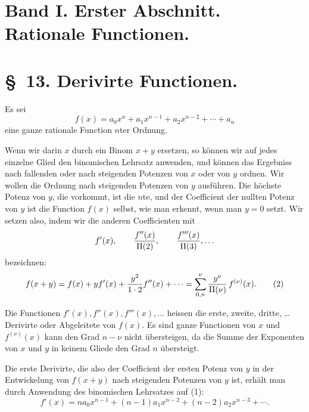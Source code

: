 \documentclass[11pt]{article}
\begin{document}
\clearpage

\clearpage
\section*{Band I. Erster Abschnitt. Rationale Functionen.}

\section*{\S~13. Derivirte Functionen.}

Es sei
\begin{equation}
 f(x)=a_0x^n+a_1x^{n-1}+a_2x^{n-2}+\cdots+a_n
\tag{1}
\end{equation}
eine ganze rationale Function $n$ter Ordnung.

Wenn wir darin $x$ durch ein Binom $x+y$ ersetzen, so können wir auf jedes einzelne Glied den binomischen Lehrsatz anwenden, und können das Ergebniss nach fallenden oder nach steigenden Potenzen von $x$ oder von $y$ ordnen. Wir wollen die Ordnung nach steigenden Potenzen von $y$ ausführen. Die höchste Potenz von $y$, die vorkommt, ist die $n$te, und der Coefficient der nullten Potenz von $y$ ist die Function $f(x)$ selbst, wie man erkennt, wenn man $y=0$ setzt. Wir setzen also, indem wir die anderen Coefficienten mit
\[
 f'(x),\qquad {f''(x)\over \Pi(2)},\qquad {f'''(x)\over \Pi(3)},\ldots
\]
bezeichnen:
\begin{equation}
 f(x+y)=f(x)+yf'(x)+{y^2\over1\cdot2}f''(x)+\cdots
       =\sum_{0,n}^{\nu}{y^\nu\over\Pi(\nu)}\,f^{(\nu)}(x).
\tag{2}
\end{equation}

Die Functionen $f'(x),f''(x),f'''(x),\ldots$ heissen die erste, zweite, dritte, \ldots{} Derivirte oder Abgeleitete von $f(x)$. Es sind ganze Functionen von $x$ und $f^{(\nu)}(x)$ kann den Grad $n-\nu$ nicht übersteigen, da die Summe der Exponenten von $x$ und $y$ in keinem Gliede den Grad $n$ übersteigt.

Die erste Derivirte, die also der Coefficient der ersten Potenz von $y$ in der Entwickelung von $f(x+y)$ nach steigenden Potenzen von $y$ ist, erhält man durch Anwendung des binomischen Lehrsatzes auf (1):
\begin{equation}
 f'(x)=na_0x^{n-1}+(n-1)a_1x^{n-2}+(n-2)a_2x^{n-3}+\cdots .
\tag{3}
\end{equation}
\end{document}
